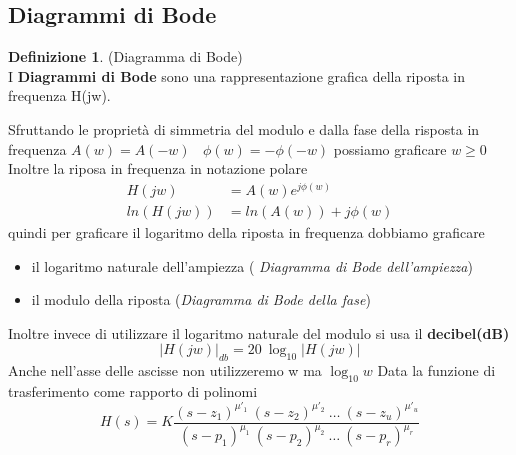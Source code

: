 \documentclass{article}
\theoremstyle{definition}
\newtheorem*{definizione}{Definizione}
\begin{document}
\subsection[Diagrammi]{Diagrammi di Bode}
\begin{definizione}(Diagramma di Bode)\\
	I \textbf{Diagrammi di Bode} sono una rappresentazione grafica della riposta in frequenza H(jw).
\end{definizione}
 Sfruttando le proprietà di simmetria del modulo e dalla fase della risposta in frequenza $A(w)=A(-w)  \ \ \  \ \phi(w)=-\phi(-w)$  possiamo graficare $w \geq 0$ 
 Inoltre la riposa in frequenza in notazione polare 
 \begin{align*}
 	H(jw)&=A(w)e^{j\phi(w)} \\
 	ln(H(jw))&=ln(A(w))+j\phi(w)
 \end{align*}
 quindi per graficare il logaritmo della riposta in frequenza dobbiamo graficare 
 \begin{itemize}
 	\item il logaritmo naturale dell'ampiezza ( \textit{Diagramma di Bode dell'ampiezza})
 	\item il modulo della riposta (\textit{Diagramma di Bode della fase})
 \end{itemize}
 Inoltre invece di utilizzare il logaritmo naturale del modulo si usa il \textbf{decibel(dB)} 
 $$|H(jw)|_{db}=20\ \log_{10}|H(jw)|$$ Anche nell'asse delle ascisse non utilizzeremo w ma $\log_{10} w$
 Data la funzione di trasferimento come rapporto di polinomi 
 $$H(s)=K\frac{(s-z_1)^{\mu'_1} \ (s-z_2)^{\mu'_2}\ \dots \ (s-z_u)^{\mu'_u}}{(s-p_1)^{\mu_1} \ (s-p_2)^{\mu_2}\ \dots \ (s-p_r)^{\mu_r}}$$
\end{document}
